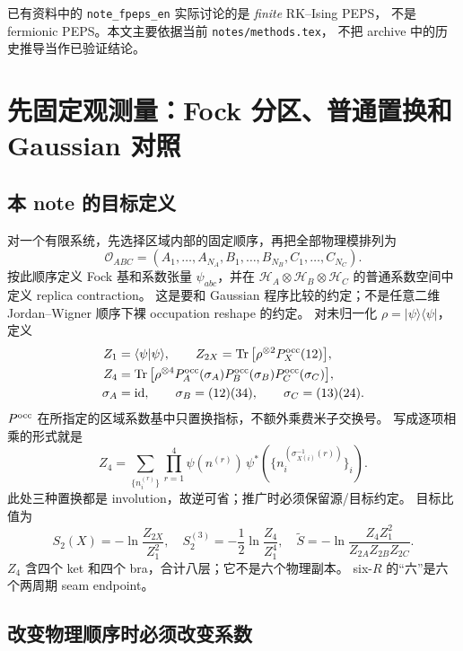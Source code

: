 \documentclass[11pt]{article}
\newcommand{\Tr}{\operatorname{Tr}}
\newcommand{\id}{\mathrm{id}}
\newcommand{\tS}{\widetilde S}
\newcommand{\code}[1]{\texttt{\small #1}}
\begin{document}
已有资料中的 \code{note\_fpeps\_en} 实际讨论的是 \emph{finite} RK--Ising PEPS，
不是 fermionic PEPS。本文主要依据当前 \code{notes/methods.tex}，
不把 archive 中的历史推导当作已验证结论。

\section{先固定观测量：Fock 分区、普通置换和 Gaussian 对照}
\subsection{本 note 的目标定义}

对一个有限系统，先选择区域内部的固定顺序，再把全部物理模排列为
\begin{equation}
 \mathcal O_{ABC}=(A_1,\ldots,A_{N_A},B_1,\ldots,B_{N_B},C_1,\ldots,C_{N_C}).
 \label{eq:regionorder}
\end{equation}
按此顺序定义 Fock 基和系数张量 $\psi_{abc}$，并在
$\mathcal H_A\otimes\mathcal H_B\otimes\mathcal H_C$ 的普通系数空间中定义 replica contraction。
这是要和 Gaussian 程序比较的约定；不是任意二维 Jordan--Wigner 顺序下裸 occupation reshape 的约定。
对未归一化 $\rho=|\psi\rangle\langle\psi|$，定义
\begin{align}
 Z_1&=\langle\psi|\psi\rangle,\qquad
 Z_{2X}=\Tr\big[\rho^{\otimes2}P_X^{\rm occ}(12)\big],\\
 Z_4&=\Tr\big[\rho^{\otimes4}
 P_A^{\rm occ}(\sigma_A)P_B^{\rm occ}(\sigma_B)P_C^{\rm occ}(\sigma_C)\big],\label{eq:zdef}\\
 \sigma_A&=\id,\qquad \sigma_B=(12)(34),\qquad \sigma_C=(13)(24).
 \label{eq:sig}
\end{align}
$P^{\rm occ}$ 在所指定的区域系数基中只置换指标，不额外乘费米子交换号。
写成逐项相乘的形式就是
\begin{equation}
 Z_4=\sum_{\{n_i^{(r)}\}}\prod_{r=1}^4
 \psi(n^{(r)})\,
 \psi^*\!\left(\{n_i^{(\sigma_{X(i)}^{-1}(r))}\}_i\right).
 \label{eq:occupation}
\end{equation}
此处三种置换都是 involution，故逆可省；推广时必须保留源/目标约定。
目标比值为
\begin{equation}
 S_2(X)=-\ln\frac{Z_{2X}}{Z_1^2},\quad
 S_2^{(3)}=-\frac12\ln\frac{Z_4}{Z_1^4},\quad
 \boxed{\tS=-\ln\frac{Z_4Z_1^2}{Z_{2A}Z_{2B}Z_{2C}}.}
 \label{eq:ratio}
\end{equation}
$Z_4$ 含四个 ket 和四个 bra，合计八层；它不是六个物理副本。
six-$R$ 的“六”是六个两周期 seam endpoint。

\subsection{改变物理顺序时必须改变系数}
\end{document}
